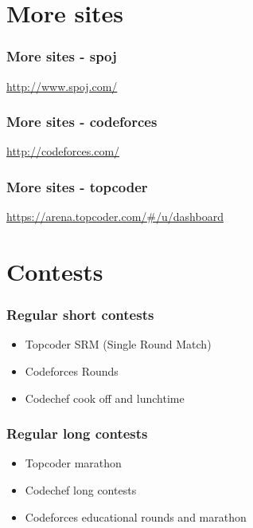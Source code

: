 \section{More sites}
\begin{frame}
    \frametitle{More sites - spoj}
    \href{http://www.spoj.com/}{http://www.spoj.com/}
\end{frame}

\begin{frame}
    \frametitle{More sites - codeforces}
    \href{http://codeforces.com/}{http://codeforces.com/}
\end{frame}

\begin{frame}
    \frametitle{More sites - topcoder}
    \href{https://arena.topcoder.com/\#/u/dashboard}{https://arena.topcoder.com/\#/u/dashboard}
\end{frame}

\section{Contests}
\begin{frame}
    \frametitle{Regular short contests}
    \begin{itemize}
        \item Topcoder SRM (Single Round Match) \\
        \item Codeforces Rounds \\
        \item Codechef cook off and lunchtime \\
    \end{itemize}
\end{frame}

\begin{frame}
    \frametitle{Regular long contests}
    \begin{itemize}
        \item Topcoder marathon \\
        \item Codechef long contests \\
        \item Codeforces educational rounds and marathon \\
    \end{itemize}
\end{frame}


